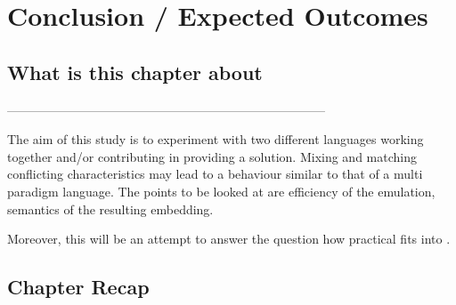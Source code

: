 \documentclass[thesis-solanki.tex]{subfiles}
\begin{document}
\chapter{Conclusion / Expected Outcomes}\label{chap:conclusion}


\section{What is this chapter about}

-----------------------------------------------------------------------------


\begin{comment}
As we have seen there have been a number of attempts at solving the problem and so have been the issues. First and foremost, with appropriate  documentation the resulting library should be easy to use. Writing a program must be very much the same as writing a program in the host language. With the introduction of few new constructs defining
\end{comment}

The aim of this study is to experiment with two different languages working together and/or contributing in providing a solution. Mixing and matching conflicting characteristics may lead to a behaviour similar to that of a multi paradigm language. The points to be looked at are efficiency of the emulation, semantics of the resulting embedding.

Moreover, this will be an attempt to answer the question how practical  fits into .                  


\section{Chapter Recap}
\end{document}
